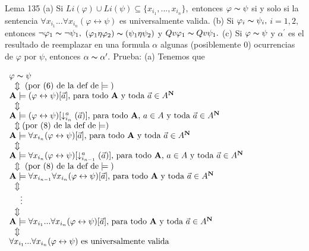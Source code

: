 Lema 135
(a) Si \(Li(\varphi )\cup Li(\psi )\subseteq \{x_{i_{1}},...,x_{i_{n}}\},\) entonces \(\varphi \thicksim \psi \) si y solo si la sentencia \(\forall x_{i_{1}}...\forall x_{i_{n}}(\varphi \leftrightarrow \psi )\) es universalmente valida.
(b) Si \(\varphi _{i}\thicksim \psi _{i},\) \(i=1,2,\) entonces \(\lnot \varphi _{1}\thicksim \lnot \psi _{1},\) \((\varphi _{1}\eta \varphi _{2})\thicksim (\psi _{1}\eta \psi _{2})\) y \(Qv\varphi _{1}\thicksim Qv\psi _{1}.\)
(c) Si \(\varphi \thicksim \psi \) y \(\alpha ^{\prime }\) es el resultado de reemplazar en una formula \(\alpha \) algunas (posiblemente \(0\)) ocurrencias de \(\varphi \) por \(\psi \), entonces \(\alpha \thicksim \alpha ^{\prime }.\)
Prueba: (a) Tenemos que

\(\displaystyle \begin{array}{l} \varphi \thicksim \psi \\ \ \ \Updownarrow \text{ (por (6) de la def de}\models \text{)} \\ \mathbf{A}\models (\varphi \leftrightarrow \psi )[\vec{a}]\text{, para todo } \mathbf{A}\text{ y toda }\vec{a}\in A^{\mathbf{N}} \\ \ \ \Updownarrow \\ \mathbf{A}\models (\varphi \leftrightarrow \psi )[\downarrow _{i_{n}}^{a}(\vec{a })]\text{, para todo }\mathbf{A}\text{, }a\in A\text{ y toda }\vec{a}\in A^{ \mathbf{N}} \\ \ \ \Updownarrow (\text{por (8) de la def de}\models ) \\ \mathbf{A}\models \forall x_{i_{n}}(\varphi \leftrightarrow \psi )[\vec{a}] \text{, para todo }\mathbf{A}\text{ y toda }\vec{a}\in A^{\mathbf{N}} \\ \ \ \Updownarrow \\ \mathbf{A}\models \forall x_{i_{n}}(\varphi \leftrightarrow \psi )[\downarrow _{i_{n-1}}^{a}(\vec{a})]\text{, para todo }\mathbf{A}\text{, }a\in A\text{ y toda }\vec{a}\in A^{\mathbf{N}} \\ \ \ \Updownarrow \text{ (por (8) de la def de}\models \text{)} \\ \mathbf{A}\models \forall x_{i_{n-1}}\forall x_{i_{n}}(\varphi \leftrightarrow \psi )[\vec{a}]\text{, para todo }\mathbf{A}\text{ y toda }\vec{a}\in A^{ \mathbf{N}} \\ \ \ \Updownarrow \\ \ \ \ \ \vdots \\ \ \ \Updownarrow \\ \mathbf{A}\models \forall x_{i_{1}}...\forall x_{i_{n}}(\varphi \leftrightarrow \psi )[\vec{a}]\text{, para todo }\mathbf{A}\text{ y toda }\vec{a}\in A^{ \mathbf{N}} \\ \ \ \Updownarrow \\ \forall x_{i_{1}}...\forall x_{i_{n}}(\varphi \leftrightarrow \psi )\text{ es universalmente valida} \end{array} \)

